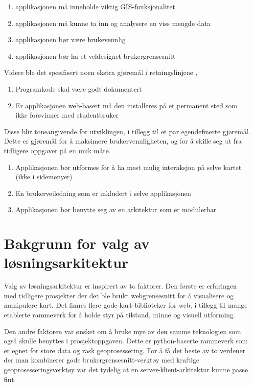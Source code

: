 \begin{enumerate}
    \item applikasjonen må inneholde viktig GIS-funksjonalitet
    \item applikasjonen må kunne ta inn og analysere en viss mengde data
    \item applikasjonen bør være brukevennlig
    \item applikasjonen bør ha et veldesignet brukergrensesnitt
\end{enumerate}

Videre ble det spesifisert noen ekstra gjøremål i retningslinjene \cite{midtbø}, 

\begin{enumerate}[resume]
    \item Programkode skal være godt dokumentert
    \item Er applikasjonen web-basert må den installeres på et permanent sted som ikke forsvinner med studentbruker
\end{enumerate}

Disse blir toneangivende for utviklingen, i tillegg til et par egendefinerte gjøremål. Dette er gjøremål for å maksimere brukervennligheten, og for å skille seg ut fra tidligere oppgaver på en unik måte. 
\begin{enumerate}[resume]
    \item Applikasjonen bør utformes for å ha mest mulig interaksjon på selve kartet (ikke i sidemenyer)
    \item En brukerveiledning som er inkludert i selve applikasjonen
    \item Applikasjonen bør benytte seg av en arkitektur som er modulerbar
\end{enumerate}

\section{Bakgrunn for valg av løsningsarkitektur}
Valg av løsningsarkitektur er inspirert av to faktorer. Den første er erfaringen med tidligere prosjekter der det ble brukt webgrensesnitt for å visualisere og manipulere kart. Det finnes flere gode kart-biblioteker for web, i tillegg til mange etablerte rammeverk for å holde styr på tilstand, minne og visuell utforming. 

Den andre faktoren var ønsket om å bruke mye av den samme teknologien som også skulle benyttes i prosjektoppgaven. Dette er python-baserte rammeverk som er egnet for store data og rask geoprosessering. For å få det beste av to verdener der man kombinerer gode brukergrensesnitt-verktøy med kraftige geoprosesseringsverktøy var det tydelig at en server-klient-arkitektur kunne passe fint. 

